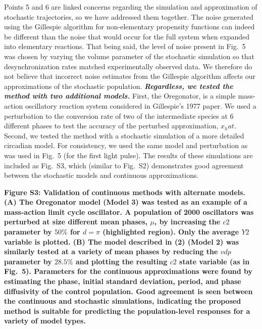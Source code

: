 \documentclass[11pt, letterpaper]{article}
\newenvironment{manuscript}[1]{\begin{center}\begin{tcolorbox}[colback=green!5!white,colframe=green!75!black,width=0.8\textwidth,title={#1},breakable,fonttitle=\bfseries]}{\end{tcolorbox}\end{center}}
\begin{document}
Points 5 and 6 are linked concerns regarding the simulation and approximation of stochastic trajectories, so we have addressed them together.
The noise generated using the Gillespie algorithm for non-elementary propensity functions can indeed be different than the noise that would occur for the full system when expanded into elementary reactions.
That being said, the level of noise present in Fig.~5 was chosen by varying the volume parameter of the stochastic simulation so that desynchronization rates matched experimentally observed data.
We therefore do not believe that incorrect noise estimates from the Gillespie algorithm affects our approximations of the stochastic population.
{\itshape\bfseries Regardless, we tested the method with two additional models.}
First, the Oregonator, is a simple mass-action oscillatory reaction system considered in Gillespie's 1977 paper.
We used a perturbation to the conversion rate of two of the intermediate species at 6 different phases to test the accuracy of the perturbed approximation, $x_hat$.
Second, we tested the method with a stochastic simulation of a more detailed circadian model.
For consistency, we used the same model and perturbation as was used in Fig.~5 (for the first light pulse).
The results of these simulations are included as Fig.~S3, which (similar to Fig.~S2) demonstrates good agreement between the stochastic models and continuous approximations.

\begin{manuscript}{Supplemental Info, Page 6}
\bfseries
Figure S3: Validation of continuous methods with alternate models.
(\bfseries A) The Oregonator model (Model 3) was tested as an example of a mass-action limit cycle oscillator.
A population of 2000 oscillators was perturbed at size different mean phases, $\mu$, by increasing the $\mathit{c2}$ parameter by $50\%$ for $d=\pi$ (highlighted region).
Only the average $\mathit{Y2}$ variable is plotted.
({\bfseries B}) The model described in (2) (Model 2) was similarly tested at a variety of mean phases by reducing the $\mathit{vdp}$ parameter by $28.5\%$ and plotting the resulting $\mathit{c2}$ state variable (as in Fig.~5).
Parameters for the continuous approximations were found by estimating the phase, initial standard deviation, period, and phase diffusivity of the control population.
Good agreement is seen between the continuous and stochastic simulations, indicating the proposed method is suitable for predicting the population-level responses for a variety of model types.
\end{manuscript}
 
\end{document}

